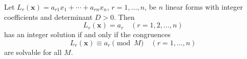 \begin{proposition}\label{eq:002}
    Let $L_r(\mathbf{x})=a_{r1}x_1+\cdots+a_{rn}x_n$, $r=1,\ldots,n$, be $n$ linear forms with integer coefficients and determinant $D>0$. Then
\[
    L_r(\mathbf{x})=a_r\quad(r=1,2,\ldots,n)
\]
    has an integer solution if and only if the congruences
\[
    L_r(\mathbf{x})\equiv a_r\pmod M\quad(r=1,\ldots,n)
\]
    are solvable for all $M$.
\end{proposition}
